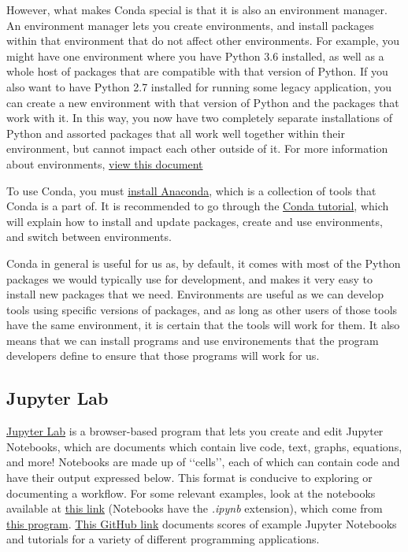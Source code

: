 \documentclass[letterpaper, 12pt]{article}
\begin{document}
However, what makes Conda special is that it is also an environment manager. An environment manager lets you create environments, and install packages within that environment that do not affect other environments. For example, you might have one environment where you have Python 3.6 installed, as well as a whole host of packages that are compatible with that version of Python. If you also want to have Python 2.7 installed for running some legacy application, you can create a new environment with that version of Python and the packages that work with it. In this way, you now have two completely separate installations of Python and assorted packages that all work well together within their environment, but cannot impact each other outside of it. For more information about environments, \href{https://docs.conda.io/projects/conda/en/latest/user-guide/concepts/environments.html}{view this document}

To use Conda, you must \href{https://docs.anaconda.com/anaconda/install/}{install Anaconda}, which is a collection of tools that Conda is a part of. It is recommended to go through the \href{https://docs.conda.io/projects/conda/en/latest/user-guide/getting-started.html}{Conda tutorial}, which will explain how to install and update packages, create and use environments, and switch between environments.

Conda in general is useful for us as, by default, it comes with most of the Python packages we would typically use for development, and makes it very easy to install new packages that we need. Environments are useful as we can develop tools using specific versions of packages, and as long as other users of those tools have the same environment, it is certain that the tools will work for them. It also means that we can install programs and use environements that the program developers define to ensure that those programs will work for us.

\subsection{Jupyter Lab}
\href{https://jupyterlab.readthedocs.io/en/stable/getting_started/overview.html}{Jupyter Lab} is a browser-based program that lets you create and edit Jupyter Notebooks, which are documents which contain live code, text, graphs, equations, and more! Notebooks are made up of \lq\lq cells\rq\rq, each of which can contain code and have their output expressed below. This format is conducive to exploring or documenting a workflow. For some relevant examples, look at the notebooks available at \href{https://hub.gke.mybinder.org/user/sobester-adrpy-010agxkw/notebooks/docs/ADRpy/notebooks/Initial%20scaling%20of%20an%20aircraft%20with%20ADRpy%20-%20the%20climb%20constraint.ipynb}{this link} (Notebooks have the \emph{.ipynb} extension), which come from \href{https://adrpy.readthedocs.io/en/latest/}{this program}. \href{https://github.com/jupyter/jupyter/wiki/A-gallery-of-interesting-Jupyter-Notebooks}{This GitHub link} documents scores of example Jupyter Notebooks and tutorials for a variety of different programming applications.
\end{document}
